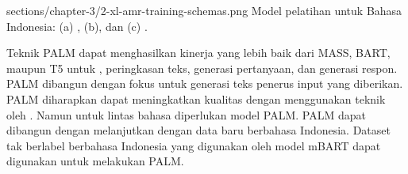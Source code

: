   {sections/chapter-3/2-xl-amr-training-schemas.png}
  {Model pelatihan \crosslingual{} untuk Bahasa Indonesia: (a) , (b), dan (c)  .}

Teknik   \gls{PALM}  dapat menghasilkan kinerja yang lebih baik dari \gls{MASS}, \gls{BART}, maupun T5 untuk  , peringkasan teks, generasi pertanyaan, dan generasi respon.
\gls{PALM} dibangun dengan fokus untuk generasi teks penerus input yang diberikan.
\gls{PALM} diharapkan dapat meningkatkan kualitas \amrparsing{} dengan menggunakan teknik  oleh \textcite{bai2022}.
Namun untuk \amrparsing{} lintas bahasa diperlukan model \multil{} \gls{PALM}.
\Multil{} \gls{PALM} dapat dibangun dengan melanjutkan \pretraining{} dengan data baru berbahasa Indonesia.
Dataset tak berlabel berbahasa Indonesia yang digunakan oleh model mBART  dapat digunakan untuk melakukan \pretraining{} \multil{} \gls{PALM}.
